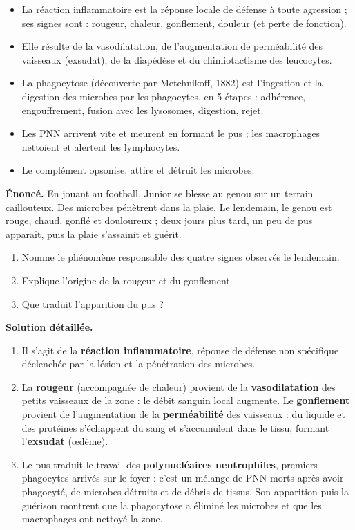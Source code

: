 \documentclass[11pt]{article}
\newcounter{popsec}
\newcounter{popsub}
\newcommand{\courssub}[1]{%
  \stepcounter{popsub}%
  \par\vspace{9pt}\noindent{\popxbold\fontsize{11.5}{13}\selectfont\color{popink}{\color{poporange}\thepopsec.\thepopsub}\hspace{6pt}#1}\par\nopagebreak\vspace{4pt}
}
\begin{document}
\courssub{Synthèse et exercice résolu}

\begin{aretenir}
\begin{itemize}
\item La réaction inflammatoire est la réponse locale de défense à toute agression ; ses signes sont : rougeur, chaleur, gonflement, douleur (et perte de fonction).
\item Elle résulte de la vasodilatation, de l'augmentation de perméabilité des vaisseaux (exsudat), de la diapédèse et du chimiotactisme des leucocytes.
\item La phagocytose (découverte par Metchnikoff, 1882) est l'ingestion et la digestion des microbes par les phagocytes, en 5 étapes : adhérence, engouffrement, fusion avec les lysosomes, digestion, rejet.
\item Les PNN arrivent vite et meurent en formant le pus ; les macrophages nettoient et alertent les lymphocytes.
\item Le complément opsonise, attire et détruit les microbes.
\end{itemize}
\end{aretenir}

\begin{exoresolu}
\textbf{Énoncé.} En jouant au football, Junior se blesse au genou sur un terrain caillouteux. Des microbes pénètrent dans la plaie. Le lendemain, le genou est rouge, chaud, gonflé et douloureux ; deux jours plus tard, un peu de pus apparaît, puis la plaie s'assainit et guérit.
\begin{enumerate}
\item Nomme le phénomène responsable des quatre signes observés le lendemain.
\item Explique l'origine de la rougeur et du gonflement.
\item Que traduit l'apparition du pus ?
\end{enumerate}
\tcblower
\textbf{Solution détaillée.}
\begin{enumerate}
\item Il s'agit de la \textbf{réaction inflammatoire}, réponse de défense non spécifique déclenchée par la lésion et la pénétration des microbes.
\item La \textbf{rougeur} (accompagnée de chaleur) provient de la \textbf{vasodilatation} des petits vaisseaux de la zone : le débit sanguin local augmente. Le \textbf{gonflement} provient de l'augmentation de la \textbf{perméabilité} des vaisseaux : du liquide et des protéines s'échappent du sang et s'accumulent dans le tissu, formant l'\textbf{exsudat} (œdème).
\item Le pus traduit le travail des \textbf{polynucléaires neutrophiles}, premiers phagocytes arrivés sur le foyer : c'est un mélange de PNN morts après avoir phagocyté, de microbes détruits et de débris de tissus. Son apparition puis la guérison montrent que la phagocytose a éliminé les microbes et que les macrophages ont nettoyé la zone.
\end{enumerate}
\end{exoresolu}
\end{document}
